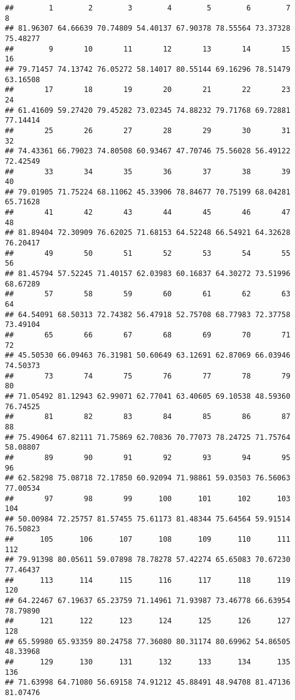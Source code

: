 \documentclass[
]{article}
\begin{document}
\begin{verbatim}
##        1        2        3        4        5        6        7        8 
## 81.96307 64.66639 70.74809 54.40137 67.90378 78.55564 73.37328 75.48277 
##        9       10       11       12       13       14       15       16 
## 79.71457 74.13742 76.05272 58.14017 80.55144 69.16296 78.51479 63.16508 
##       17       18       19       20       21       22       23       24 
## 61.41609 59.27420 79.45282 73.02345 74.88232 79.71768 69.72881 77.14414 
##       25       26       27       28       29       30       31       32 
## 74.43361 66.79023 74.80508 60.93467 47.70746 75.56028 56.49122 72.42549 
##       33       34       35       36       37       38       39       40 
## 79.01905 71.75224 68.11062 45.33906 78.84677 70.75199 68.04281 65.71628 
##       41       42       43       44       45       46       47       48 
## 81.89404 72.30909 76.62025 71.68153 64.52248 66.54921 64.32628 76.20417 
##       49       50       51       52       53       54       55       56 
## 81.45794 57.52245 71.40157 62.03983 60.16837 64.30272 73.51996 68.67289 
##       57       58       59       60       61       62       63       64 
## 64.54091 68.50313 72.74382 56.47918 52.75708 68.77983 72.37758 73.49104 
##       65       66       67       68       69       70       71       72 
## 45.50530 66.09463 76.31981 50.60649 63.12691 62.87069 66.03946 74.50373 
##       73       74       75       76       77       78       79       80 
## 71.05492 81.12943 62.99071 62.77041 63.40605 69.10538 48.59360 76.74525 
##       81       82       83       84       85       86       87       88 
## 75.49064 67.82111 71.75869 62.70836 70.77073 78.24725 71.75764 58.08807 
##       89       90       91       92       93       94       95       96 
## 62.58298 75.08718 72.17850 60.92094 71.98861 59.03503 76.56063 77.00534 
##       97       98       99      100      101      102      103      104 
## 50.00984 72.25757 81.57455 75.61173 81.48344 75.64564 59.91514 76.50823 
##      105      106      107      108      109      110      111      112 
## 79.91398 80.05611 59.07898 78.78278 57.42274 65.65083 70.67230 77.46437 
##      113      114      115      116      117      118      119      120 
## 64.22467 67.19637 65.23759 71.14961 71.93987 73.46778 66.63954 78.79890 
##      121      122      123      124      125      126      127      128 
## 65.59980 65.93359 80.24758 77.36080 80.31174 80.69962 54.86505 48.33968 
##      129      130      131      132      133      134      135      136 
## 71.63998 64.71080 56.69158 74.91212 45.88491 48.94708 81.47136 81.07476 

\end{verbatim}
\end{document}
